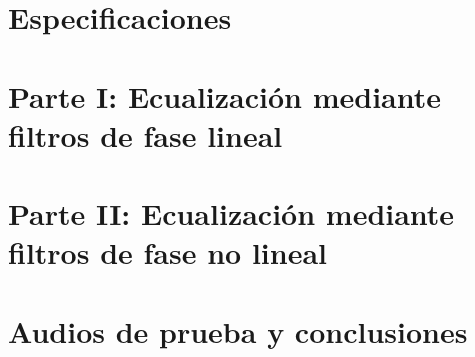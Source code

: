 \documentclass[10pt,a4paper]{article}
\begin{document}
		
	\setcounter{page}{1}

	\section{Especificaciones}\label{sec:specs}
		
		
	\section{Parte I: Ecualización mediante filtros de fase lineal}\label{sec:partei}
		

	\section{Parte II: Ecualización mediante filtros de fase no lineal}\label{sec:parteii}
                
                
    \section{Audios de prueba y conclusiones}\label{sec:audios}
                
	
\end{document}
